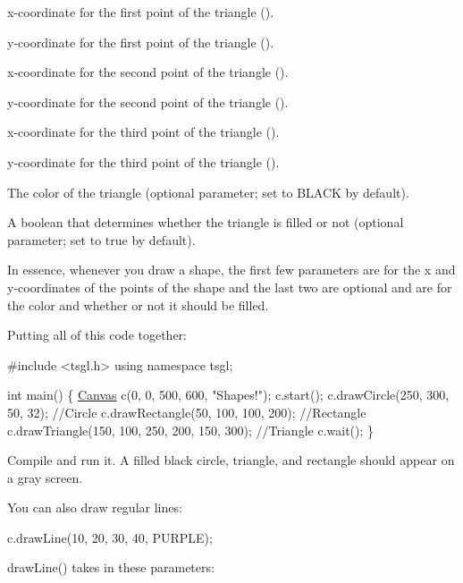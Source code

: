 \begin{DoxyItemize}
\item x-\/coordinate for the first point of the triangle ({}).
\item y-\/coordinate for the first point of the triangle ({}).
\item x-\/coordinate for the second point of the triangle ({}).
\item y-\/coordinate for the second point of the triangle ({}).
\item x-\/coordinate for the third point of the triangle ({}).
\item y-\/coordinate for the third point of the triangle ({}).
\item The color of the triangle (optional parameter; set to {\ttfamily B\-L\-A\-C\-K} by default).
\item A boolean that determines whether the triangle is filled or not (optional parameter; set to {\ttfamily true} by default).
\end{DoxyItemize}

In essence, whenever you draw a shape, the first few parameters are for the x and y-\/coordinates of the points of the shape and the last two are optional and are for the color and whether or not it should be filled.

Putting all of this code together\-:


\begin{DoxyCode}
\textcolor{preprocessor}{#include <tsgl.h>}
\textcolor{keyword}{using namespace }tsgl;

\textcolor{keywordtype}{int} main() \{
  \hyperlink{classtsgl_1_1_canvas}{Canvas} c(0, 0, 500, 600, \textcolor{stringliteral}{"Shapes!"});
  c.start();
  c.drawCircle(250, 300, 50, 32);  \textcolor{comment}{//Circle}
  c.drawRectangle(50, 100, 100, 200);  \textcolor{comment}{//Rectangle}
  c.drawTriangle(150, 100, 250, 200, 150, 300);  \textcolor{comment}{//Triangle}
  c.wait();
\}
\end{DoxyCode}


Compile and run it. A filled black circle, triangle, and rectangle should appear on a gray screen.

You can also draw regular lines\-:


\begin{DoxyCode}
c.drawLine(10, 20, 30, 40, PURPLE);
\end{DoxyCode}


{\ttfamily draw\-Line()} takes in these parameters\-:


